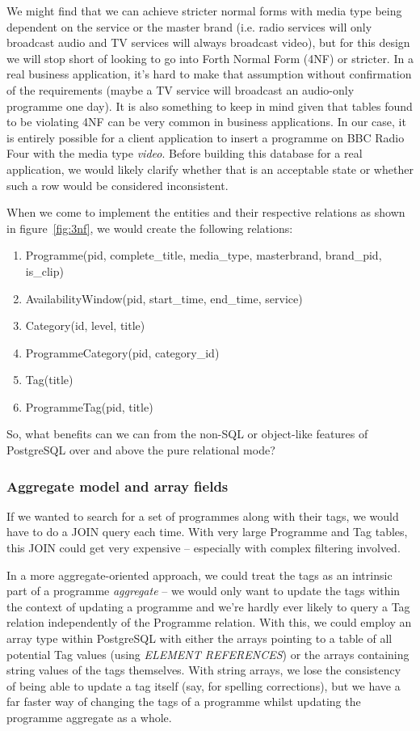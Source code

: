 \documentclass[11pt,a4paper]{article}
\begin{document}
We might find that we can achieve stricter normal forms with
media type being dependent on the service or the master brand
(i.e. radio services will only broadcast audio and TV services
will always broadcast video), but for this design we will stop short
of looking to go into Forth Normal Form (4NF) or stricter.
\cite{fagin1977multivalued}
In a real business application, it's hard to make that assumption
without confirmation of the requirements (maybe a TV service will
broadcast an audio-only programme one day). It is also something to keep in
mind given that tables found to be violating 4NF can be very common
in business applications. \cite{wu1992practical} In our case, it is
entirely possible for a client application to insert a programme on
BBC Radio Four with the media type \emph{video}. Before building
this database for a real application, we would likely clarify whether
that is an acceptable state or whether such a row would be considered
inconsistent.

When we come to implement the entities and their respective relations
as shown in figure~\ref{fig:3nf}, we would create the following relations:

\begin{enumerate}
  \item Programme(pid, complete\_title, media\_type, masterbrand, brand\_pid, is\_clip)
  \item AvailabilityWindow(pid, start\_time, end\_time, service)
  \item Category(id, level, title)
  \item ProgrammeCategory(pid, category\_id)
  \item Tag(title)
  \item ProgrammeTag(pid, title)
\end{enumerate}

So, what benefits can we can from the non-SQL or object-like features of
PostgreSQL over and above the pure relational mode?

\subsubsection{Aggregate model and array fields}

If we wanted to search for a set of programmes along with their tags, we would
have to do a JOIN query each time. With very large Programme and Tag tables, this
JOIN could get very expensive -- especially with complex filtering involved.

In a more aggregate-oriented approach, we could treat the tags as an
intrinsic part of a programme \emph{aggregate} -- we would only want to update
the tags within the context of updating a programme and we're hardly
ever likely to query a Tag relation independently of the Programme relation.
With this, we could employ an array type within PostgreSQL with either the
arrays pointing to a table of all potential Tag values
(using \emph{ELEMENT REFERENCES})
or the arrays containing string values of the tags themselves. With string
arrays, we lose the consistency of being able to update a tag itself (say,
for spelling corrections), but we have a far faster way of changing the tags
of a programme whilst updating the programme aggregate as a whole.
\end{document}
